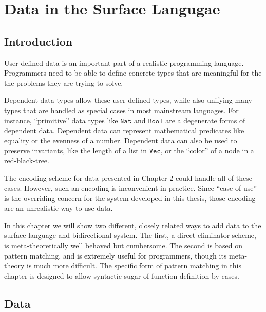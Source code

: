 \chapter{Data in the Surface Langugae}
\label{chapter:SurfaceData}
\thispagestyle{myheadings}



\section{Introduction}

User defined data is an important part of a realistic programming
language. Programmers need to be able to define concrete types that
are meaningful for the the problems they are trying to solve.

Dependent data types allow these user defined types, while also unifying
many types that are handled as special cases in most mainstream languages.
For instance, ``primitive'' data types like $\mathtt{Nat}$ and
$\mathtt{Bool}$ are a degenerate forms of dependent data. Dependent
data can represent mathematical predicates like equality or the evenness
of a number. Dependent data can also be used to preserve invariants,
like the length of a list in $\mathtt{Vec}$, or the ``color'' of
a node in a red-black-tree.

The encoding scheme for data presented in Chapter 2 could handle all
of these cases. However, such an encoding is inconvenient in practice.
Since ``ease of use'' is the overriding concern for the system developed
in this thesis, those encoding are an unrealistic way to use data.

In this chapter we will show two different, closely related ways to
add data to the surface language and bidirectional system. The first,
a direct eliminator scheme, is meta-theoretically well behaved but
cumbersome. The second is based on pattern matching, and is extremely
useful for programmers, though its meta-theory is much more difficult.
The specific form of pattern matching in this chapter is designed
to allow syntactic sugar of function definition by cases. 

\section{Data }



